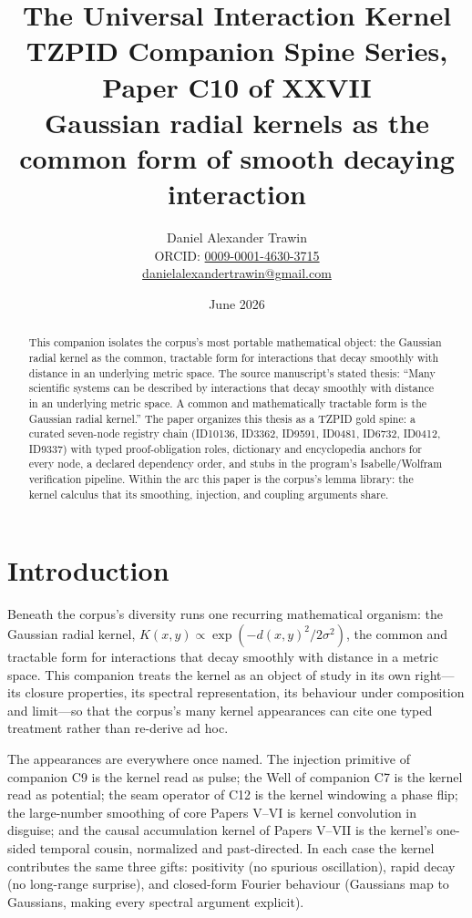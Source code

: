\documentclass[11pt]{article}
\title{The Universal Interaction Kernel\\[0.6em]
\large TZPID Companion Spine Series, Paper C10 of XXVII\\
\normalsize Gaussian radial kernels as the common form of smooth decaying interaction}
\author{Daniel Alexander Trawin\\
\small ORCID: \href{https://orcid.org/0009-0001-4630-3715}{0009-0001-4630-3715}\\
\small \href{mailto:danielalexandertrawin@gmail.com}{danielalexandertrawin@gmail.com}}
\date{June 2026}
\theoremstyle{remark}
\begin{document}
\maketitle

\begin{abstract}
This companion isolates the corpus's most portable mathematical object: the Gaussian radial kernel as the common, tractable form for interactions that decay smoothly with distance in an underlying metric space.
The source manuscript's stated thesis: ``Many scientific systems can be described by interactions that decay smoothly with distance in an underlying metric space. A common and mathematically tractable form is the Gaussian radial kernel.'' The paper organizes this thesis as a TZPID gold spine: a curated seven-node registry chain (ID10136, ID3362, ID9591, ID0481, ID6732, ID0412, ID9337) with typed proof-obligation roles, dictionary and encyclopedia anchors for every node, a declared dependency order, and stubs in the program's Isabelle/Wolfram verification pipeline. Within the arc this paper is the corpus's lemma library: the kernel calculus that its smoothing, injection, and coupling arguments share.
\end{abstract}

\section{Introduction}
\label{sec:intro}

Beneath the corpus's diversity runs one recurring mathematical organism: the Gaussian radial kernel, $K(x, y) \propto \exp(-d(x,y)^2/2\sigma^2)$, the common and tractable form for interactions that decay smoothly with distance in a metric space. This companion treats the kernel as an object of study in its own right---its closure properties, its spectral representation, its behaviour under composition and limit---so that the corpus's many kernel appearances can cite one typed treatment rather than re-derive ad hoc.

The appearances are everywhere once named. The injection primitive of companion C9 is the kernel read as pulse; the Well of companion C7 is the kernel read as potential; the seam operator of C12 is the kernel windowing a phase flip; the large-number smoothing of core Papers V--VI is kernel convolution in disguise; and the causal accumulation kernel of Papers V--VII is the kernel's one-sided temporal cousin, normalized and past-directed. In each case the kernel contributes the same three gifts: positivity (no spurious oscillation), rapid decay (no long-range surprise), and closed-form Fourier behaviour (Gaussians map to Gaussians, making every spectral argument explicit).
\end{document}
